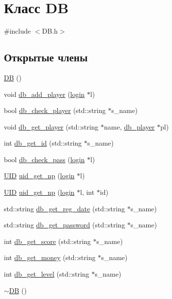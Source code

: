 \hypertarget{class_d_b}{}\section{Класс DB}
\label{class_d_b}


{\ttfamily \#include $<$D\+B.\+h$>$}

\subsection*{Открытые члены}
\begin{DoxyCompactItemize}
\item 
\mbox{\hyperlink{class_d_b_a29a603c52c10831cddee82518417f992}{DB}} ()
\item 
void \mbox{\hyperlink{class_d_b_a472c425f9a22c467e4acd0e800153837}{db\+\_\+add\+\_\+player}} (\mbox{\hyperlink{structlogin}{login}} $\ast$l)
\item 
bool \mbox{\hyperlink{class_d_b_aea6044c3fffc4c31714c732bb3789f71}{db\+\_\+check\+\_\+player}} (std\+::string $\ast$s\+\_\+name)
\item 
void \mbox{\hyperlink{class_d_b_a1e5d244a838c99a8753727cf0abd1f70}{db\+\_\+get\+\_\+player}} (std\+::string $\ast$name, \mbox{\hyperlink{structdb__player}{db\+\_\+player}} $\ast$pl)
\item 
int \mbox{\hyperlink{class_d_b_aa8cdb5ec4f2f269d13cff52b9e47c4cb}{db\+\_\+get\+\_\+id}} (std\+::string $\ast$s\+\_\+name)
\item 
bool \mbox{\hyperlink{class_d_b_a0608c5cb7f815d143a54bda2e318de84}{db\+\_\+check\+\_\+pass}} (\mbox{\hyperlink{structlogin}{login}} $\ast$l)
\item 
\mbox{\hyperlink{struct_u_i_d}{U\+ID}} \mbox{\hyperlink{class_d_b_a5acc70d365de65365c861533a2b755c3}{uid\+\_\+get\+\_\+np}} (\mbox{\hyperlink{structlogin}{login}} $\ast$l)
\item 
\mbox{\hyperlink{struct_u_i_d}{U\+ID}} \mbox{\hyperlink{class_d_b_a9c55abcaab4db2b421bf72c968a818a4}{uid\+\_\+get\+\_\+np}} (\mbox{\hyperlink{structlogin}{login}} $\ast$l, int $\ast$id)
\item 
std\+::string \mbox{\hyperlink{class_d_b_ad7c6310d2669acd40978fd4662f90d53}{db\+\_\+get\+\_\+reg\+\_\+date}} (std\+::string $\ast$s\+\_\+name)
\item 
std\+::string \mbox{\hyperlink{class_d_b_a35efc0a2ff41b4ef47c88c87f20feee4}{db\+\_\+get\+\_\+password}} (std\+::string $\ast$s\+\_\+name)
\item 
int \mbox{\hyperlink{class_d_b_a990cefb97ea7222649511f37334a8601}{db\+\_\+get\+\_\+score}} (std\+::string $\ast$s\+\_\+name)
\item 
int \mbox{\hyperlink{class_d_b_a004b212ee48936251ff24b9f70d67dd0}{db\+\_\+get\+\_\+money}} (std\+::string $\ast$s\+\_\+name)
\item 
int \mbox{\hyperlink{class_d_b_a7792fdc9d2dc66bfa5ba84aa9db1ee8b}{db\+\_\+get\+\_\+level}} (std\+::string $\ast$s\+\_\+name)
\item 
\mbox{\hyperlink{class_d_b_a7bd1418f67b11d0f752537123e7e6d28}{$\sim$\+DB}} ()
\end{DoxyCompactItemize}


